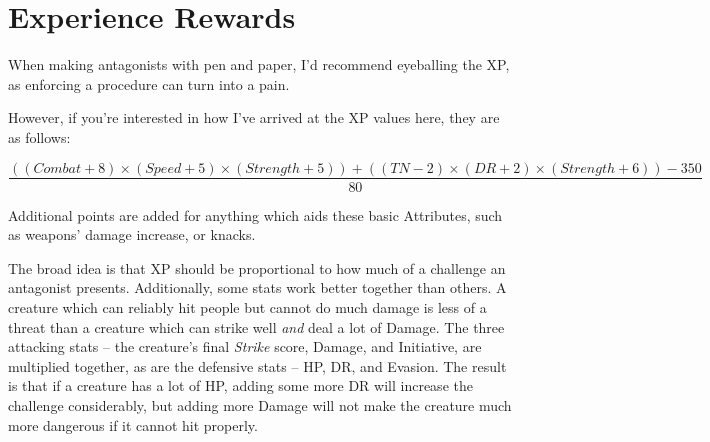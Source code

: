 \chapter{Experience Rewards}

\begin{multicols}{2}

When making antagonists with pen and paper, I'd recommend eyeballing the XP, as enforcing a procedure can turn into a pain.

However, if you're interested in how I've arrived at the XP values here, they are as follows:

\end{multicols}

\begin{equation}
\frac{(( Combat + 8 ) \times ( Speed + 5) \times ( Strength + 5 ) ) + ( ( TN -2 ) \times ( DR + 2 ) \times ( Strength + 6 )) - 350}{80}
\end{equation}

\begin{multicols}{2}

Additional points are added for anything which aids these basic Attributes, such as weapons' damage increase, or knacks.

\label{lastpage}The broad idea is that XP should be proportional to how much of a challenge an antagonist presents.
Additionally, some stats work better together than others.
A creature which can reliably hit people but cannot do much damage is less of a threat than a creature which can strike well \emph{and} deal a lot of Damage.
The three attacking stats -- the creature's final \textit{Strike} score, Damage, and Initiative, are multiplied together, as are the defensive stats -- HP, DR, and Evasion.
The result is that if a creature has a lot of HP, adding some more DR will increase the challenge considerably, but adding more Damage will not make the creature much more dangerous if it cannot hit properly.

\end{multicols}
